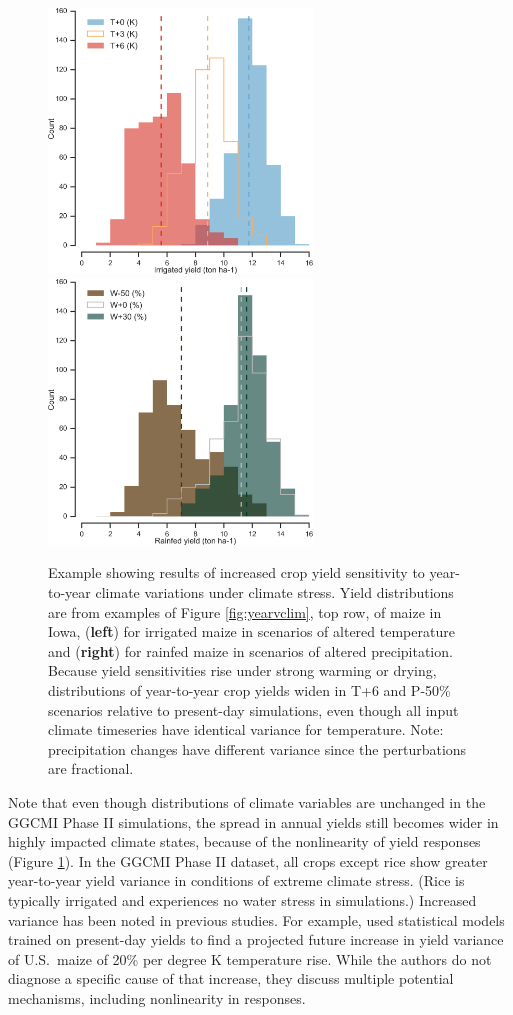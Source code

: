 \documentclass[gmdd]{copernicus} %
\begin{document}
\begin{figure}[ht]
\centering
   \includegraphics[width=7cm]{figures/hist_year_t.png} \hspace{10mm} \includegraphics[width=7cm]{figures/hist_year_pr.png}
   \caption{
   Example showing results of increased crop yield sensitivity to year-to-year climate variations under climate stress. 
   Yield distributions are from examples of Figure \ref{fig:yearvclim}, top row, of maize in Iowa, (\textbf{left}) for irrigated maize in scenarios of altered temperature and (\textbf{right}) for rainfed maize in scenarios of altered precipitation.
   Because yield sensitivities rise under strong warming or drying, distributions of year-to-year crop yields widen in T+6  and P-50\% scenarios relative to present-day simulations, even though all input climate timeseries have identical variance for temperature. Note: precipitation changes have different variance since the perturbations are fractional.  
    }
   \label{fig:yearly}
\end{figure}

Note that even though distributions of climate variables are unchanged in the GGCMI Phase II simulations, the spread in annual yields still becomes wider in highly impacted climate states, because of the nonlinearity of yield responses (Figure \ref{fig:yearly}). 
In the GGCMI Phase II dataset, all crops except rice show  greater year-to-year yield variance in conditions of extreme climate stress.
(Rice is typically irrigated and experiences no water stress in simulations.) 
Increased variance has been noted in previous studies. 
For example, \citet{Urban2012} used statistical models trained on present-day yields to find a projected future increase in yield variance of U.S.\ maize of 20\% per degree K temperature rise. While the authors do not diagnose a specific cause of that increase, they discuss multiple potential mechanisms, including nonlinearity in responses. 
\end{document}
